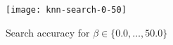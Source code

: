 \begin{figure}[h]
	\centering
	\texttt{[image: knn-search-0-50]} %
	\caption{Search accuracy for $\beta \in \{ 0.0, \ldots, 50.0 \}$}\label{figure:knn-search-coarse}
\end{figure}
